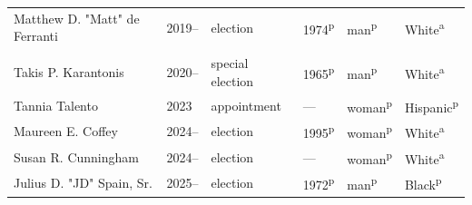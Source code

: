\begin{longtable}{Q}
Matthew D. "Matt" de Ferranti & 2019-- & election & 1974\textsuperscript{p} & man\textsuperscript{p} & White\textsuperscript{a} \\
\addlinespace[1.4ex]
 \\*
Takis P. Karantonis & 2020-- & special election & 1965\textsuperscript{p} & man\textsuperscript{p} & White\textsuperscript{a} \\*
Tannia Talento & 2023 & appointment & --- & woman\textsuperscript{p} & Hispanic\textsuperscript{p} \\
Maureen E. Coffey & 2024-- & election & 1995\textsuperscript{p} & woman\textsuperscript{p} & White\textsuperscript{a} \\
Susan R. Cunningham & 2024-- & election & --- & woman\textsuperscript{p} & White\textsuperscript{a} \\*
Julius D. "JD" Spain, Sr. & 2025-- & election & 1972\textsuperscript{p} & man\textsuperscript{p} & Black\textsuperscript{p} \\
\end{longtable}\par
\endgroup
